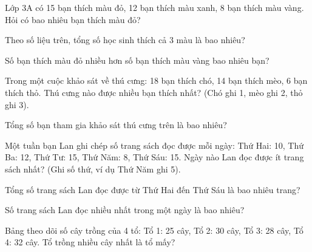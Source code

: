 \begin{ex}
Lớp 3A có 15 bạn thích màu đỏ, 12 bạn thích màu xanh, 8 bạn thích màu vàng. Hỏi có bao nhiêu bạn thích màu đỏ?
\end{ex}

\begin{ex}
Theo số liệu trên, tổng số học sinh thích cả 3 màu là bao nhiêu?
\end{ex}

\begin{ex}
Số bạn thích màu đỏ nhiều hơn số bạn thích màu vàng bao nhiêu bạn?
\end{ex}

\begin{ex}
Trong một cuộc khảo sát về thú cưng: 18 bạn thích chó, 14 bạn thích mèo, 6 bạn thích thỏ. Thú cưng nào được nhiều bạn thích nhất? (Chó ghi 1, mèo ghi 2, thỏ ghi 3).
\end{ex}

\begin{ex}
Tổng số bạn tham gia khảo sát thú cưng trên là bao nhiêu?
\end{ex}

\begin{ex}
Một tuần bạn Lan ghi chép số trang sách đọc được mỗi ngày: Thứ Hai: 10, Thứ Ba: 12, Thứ Tư: 15, Thứ Năm: 8, Thứ Sáu: 15. Ngày nào Lan đọc được ít trang sách nhất? (Ghi số thứ, ví dụ Thứ Năm ghi 5).
\end{ex}

\begin{ex}
Tổng số trang sách Lan đọc được từ Thứ Hai đến Thứ Sáu là bao nhiêu trang?
\end{ex}

\begin{ex}
Số trang sách Lan đọc nhiều nhất trong một ngày là bao nhiêu?
\end{ex}

\begin{ex}
Bảng theo dõi số cây trồng của 4 tổ: Tổ 1: 25 cây, Tổ 2: 30 cây, Tổ 3: 28 cây, Tổ 4: 32 cây. Tổ trồng nhiều cây nhất là tổ mấy?
\end{ex}

